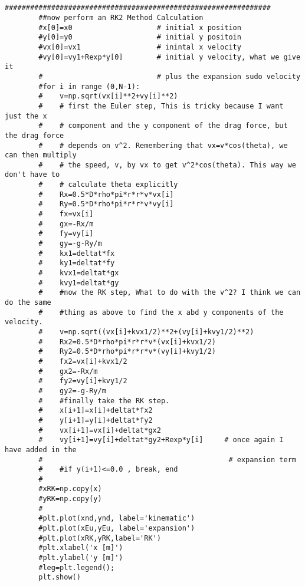 \begin{small}
\begin{verbatim}
		
		###############################################################
		##now perform an RK2 Method Calculation
		#x[0]=x0                    # initial x position
		#y[0]=y0                    # initial y positoin
		#vx[0]=vx1                  # inintal x velocity
		#vy[0]=vy1+Rexp*y[0]        # initial y velocity, what we give it
		#                           # plus the expansion sudo velocity
		#for i in range (0,N-1):
		#    v=np.sqrt(vx[i]**2+vy[i]**2)
		#    # first the Euler step, This is tricky because I want just the x
		#    # component and the y component of the drag force, but the drag force
		#    # depends on v^2. Remembering that vx=v*cos(theta), we can then multiply
		#    # the speed, v, by vx to get v^2*cos(theta). This way we don't have to
		#    # calculate theta explicitly
		#    Rx=0.5*D*rho*pi*r*r*v*vx[i]
		#    Ry=0.5*D*rho*pi*r*r*v*vy[i]
		#    fx=vx[i]
		#    gx=-Rx/m
		#    fy=vy[i]
		#    gy=-g-Ry/m
		#    kx1=deltat*fx
		#    ky1=deltat*fy
		#    kvx1=deltat*gx
		#    kvy1=deltat*gy
		#    #now the RK step, What to do with the v^2? I think we can do the same
		#    #thing as above to find the x abd y components of the velocity.
		#    v=np.sqrt((vx[i]+kvx1/2)**2+(vy[i]+kvy1/2)**2)
		#    Rx2=0.5*D*rho*pi*r*r*v*(vx[i]+kvx1/2)
		#    Ry2=0.5*D*rho*pi*r*r*v*(vy[i]+kvy1/2)
		#    fx2=vx[i]+kvx1/2
		#    gx2=-Rx/m
		#    fy2=vy[i]+kvy1/2
		#    gy2=-g-Ry/m
		#    #finally take the RK step.
		#    x[i+1]=x[i]+deltat*fx2
		#    y[i+1]=y[i]+deltat*fy2
		#    vx[i+1]=vx[i]+deltat*gx2
		#    vy[i+1]=vy[i]+deltat*gy2+Rexp*y[i]     # once again I have added in the 
		#                                            # expansion term
		#    #if y(i+1)<=0.0 , break, end
		#    
		#xRK=np.copy(x)
		#yRK=np.copy(y)
		#
		#plt.plot(xnd,ynd, label='kinematic')
		#plt.plot(xEu,yEu, label='expansion')
		#plt.plot(xRK,yRK,label='RK')
		#plt.xlabel('x [m]')
		#plt.ylabel('y [m]')
		#leg=plt.legend();
		plt.show()

	
	\end{verbatim}
	
\end{small}


